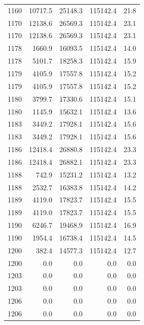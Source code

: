 \begin{longtable}{rrrrr}
    1160 & \num{10717.5} & \num{25148.3} & \num{115142.4} & 21.8 \\
    1170 & \num{12138.6} & \num{26569.3} & \num{115142.4} & 23.1 \\
    1170 & \num{12138.6} & \num{26569.3} & \num{115142.4} & 23.1 \\
    1178 & \num{1660.9} & \num{16093.5} & \num{115142.4} & 14.0 \\
    1178 & \num{5101.7} & \num{18258.3} & \num{115142.4} & 15.9 \\
    1179 & \num{4105.9} & \num{17557.8} & \num{115142.4} & 15.2 \\
    1179 & \num{4105.9} & \num{17557.8} & \num{115142.4} & 15.2 \\
    1180 & \num{3799.7} & \num{17330.6} & \num{115142.4} & 15.1 \\
    1180 & \num{1145.9} & \num{15632.1} & \num{115142.4} & 13.6 \\
    1183 & \num{3449.2} & \num{17928.1} & \num{115142.4} & 15.6 \\
    1183 & \num{3449.2} & \num{17928.1} & \num{115142.4} & 15.6 \\
    1186 & \num{12418.4} & \num{26880.8} & \num{115142.4} & 23.3 \\
    1186 & \num{12418.4} & \num{26882.1} & \num{115142.4} & 23.3 \\
    1188 & \num{742.9} & \num{15231.2} & \num{115142.4} & 13.2 \\
    1188 & \num{2532.7} & \num{16383.8} & \num{115142.4} & 14.2 \\
    1189 & \num{4119.0} & \num{17823.7} & \num{115142.4} & 15.5 \\
    1189 & \num{4119.0} & \num{17823.7} & \num{115142.4} & 15.5 \\
    1190 & \num{6246.7} & \num{19468.9} & \num{115142.4} & 16.9 \\
    1190 & \num{1954.4} & \num{16738.4} & \num{115142.4} & 14.5 \\
    1200 & \num{382.4} & \num{14577.3} & \num{115142.4} & 12.7 \\
    1200 & \num{0.0} & \num{0.0} & \num{0.0} & 0.0 \\
    1203 & \num{0.0} & \num{0.0} & \num{0.0} & 0.0 \\
    1203 & \num{0.0} & \num{0.0} & \num{0.0} & 0.0 \\
    1206 & \num{0.0} & \num{0.0} & \num{0.0} & 0.0 \\
    1206 & \num{0.0} & \num{0.0} & \num{0.0} & 0.0 \\

\end{longtable}
